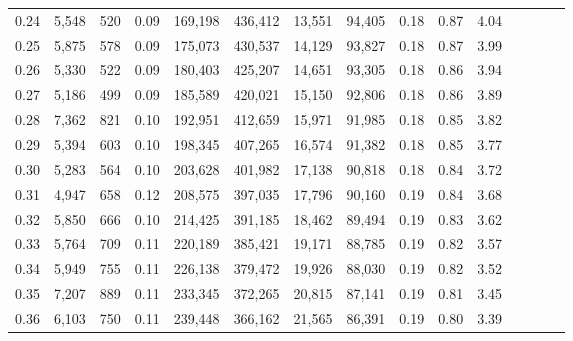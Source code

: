 \begin{tabular}{rrrcrrrrrrrrrrr}
0.24 &   5,548 &     520 &                                       0.09 &  169,198 &  436,412 &   13,551 &   94,405 &  0.18 &  0.87 &                         4.04 \\
0.25 &   5,875 &     578 &                                       0.09 &  175,073 &  430,537 &   14,129 &   93,827 &  0.18 &  0.87 &                         3.99 \\
0.26 &   5,330 &     522 &                                       0.09 &  180,403 &  425,207 &   14,651 &   93,305 &  0.18 &  0.86 &                         3.94 \\
0.27 &   5,186 &     499 &                                       0.09 &  185,589 &  420,021 &   15,150 &   92,806 &  0.18 &  0.86 &                         3.89 \\
0.28 &   7,362 &     821 &                                       0.10 &  192,951 &  412,659 &   15,971 &   91,985 &  0.18 &  0.85 &                         3.82 \\
0.29 &   5,394 &     603 &                                       0.10 &  198,345 &  407,265 &   16,574 &   91,382 &  0.18 &  0.85 &                         3.77 \\
0.30 &   5,283 &     564 &                                       0.10 &  203,628 &  401,982 &   17,138 &   90,818 &  0.18 &  0.84 &                         3.72 \\
0.31 &   4,947 &     658 &                                       0.12 &  208,575 &  397,035 &   17,796 &   90,160 &  0.19 &  0.84 &                         3.68 \\
0.32 &   5,850 &     666 &                                       0.10 &  214,425 &  391,185 &   18,462 &   89,494 &  0.19 &  0.83 &                         3.62 \\
0.33 &   5,764 &     709 &                                       0.11 &  220,189 &  385,421 &   19,171 &   88,785 &  0.19 &  0.82 &                         3.57 \\
0.34 &   5,949 &     755 &                                       0.11 &  226,138 &  379,472 &   19,926 &   88,030 &  0.19 &  0.82 &                         3.52 \\
0.35 &   7,207 &     889 &                                       0.11 &  233,345 &  372,265 &   20,815 &   87,141 &  0.19 &  0.81 &                         3.45 \\
0.36 &   6,103 &     750 &                                       0.11 &  239,448 &  366,162 &   21,565 &   86,391 &  0.19 &  0.80 &                         3.39 \\

\end{tabular}
